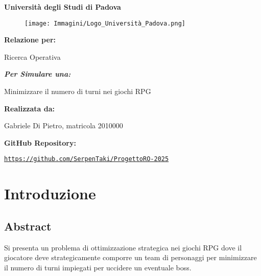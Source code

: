 \documentclass[12pt]{article}
\renewcommand{\familydefault}{\rmdefault} %
\begin{document}
\begin{titlepage}
    \centering
    {\Huge \textbf{Università degli Studi di Padova} \par}
    \vspace{1cm}
    \begin{figure}[h!]
        \centering
        \texttt{[image: Immagini/Logo\_Università\_Padova.png]}
    \end{figure}
    \vspace{0.5cm}
    {\LARGE \textbf{Relazione per:} \par}
    {\Huge Ricerca Operativa \par}
    \vspace{0.5cm}
    {\Large \textit{\textbf{Per Simulare una:}} \par}
    {\Large Minimizzare il numero di turni nei giochi RPG \par}
    \vfill
    \textbf{Realizzata da:} \par
    Gabriele Di Pietro, matricola 2010000 \par
    \vspace{0.5cm}
    \textbf{GitHub Repository:} \par
    \texttt{\url{https://github.com/SerpenTaki/ProgettoRO-2025}}
\end{titlepage}
    \renewcommand{\familydefault}{\sfdefault} %
    \fontsize{10}{12}\selectfont
    \newpage
    \section{Introduzione}
    \subsection{Abstract}
    Si presenta un problema di ottimizzazione strategica nei giochi RPG dove il giocatore deve strategicamente comporre un team di personaggi per minimizzare il numero di turni impiegati per uccidere un eventuale boss.\\
\end{document}
